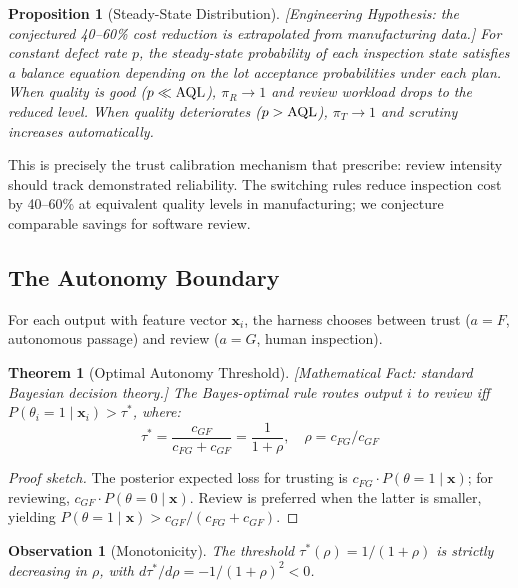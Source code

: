 \documentclass[11pt, a4paper]{googledeepmind}
\newtheorem{theorem}{Theorem}[section]
\newtheorem{proposition}{Proposition}[section]
\newtheorem{observation}{Observation}[section]
\begin{document}
\begin{proposition}[Steady-State Distribution]
\emph{[Engineering Hypothesis: the conjectured 40--60\% cost reduction is extrapolated from manufacturing data.]}
\label{prop:steady-state}
For constant defect rate $p$, the steady-state probability of each inspection state satisfies a balance equation depending on the lot acceptance probabilities under each plan. When quality is good ($p \ll \textup{AQL}$), $\pi_R \to 1$ and review workload drops to the reduced level. When quality deteriorates ($p > \textup{AQL}$), $\pi_T \to 1$ and scrutiny increases automatically.
\end{proposition}

This is precisely the trust calibration mechanism that \citet{lee2004trust} prescribe: review intensity should track demonstrated reliability. The switching rules reduce inspection cost by 40--60\% at equivalent quality levels in manufacturing; we conjecture comparable savings for software review.

\subsection{The Autonomy Boundary}

For each output with feature vector $\mathbf{x}_i$, the harness chooses between trust ($a = F$, autonomous passage) and review ($a = G$, human inspection).

\begin{theorem}[Optimal Autonomy Threshold]
\emph{[Mathematical Fact: standard Bayesian decision theory.]}
\label{thm:threshold}
The Bayes-optimal rule routes output $i$ to review iff $P(\theta_i = 1 \mid \mathbf{x}_i) > \tau^*$, where:
\begin{equation}
\tau^* = \frac{c_{GF}}{c_{FG} + c_{GF}} = \frac{1}{1 + \rho}, \quad \rho = c_{FG}/c_{GF}
\end{equation}
\end{theorem}

\begin{proof}[Proof sketch]
The posterior expected loss for trusting is $c_{FG} \cdot P(\theta = 1 \mid \mathbf{x})$; for reviewing, $c_{GF} \cdot P(\theta = 0 \mid \mathbf{x})$. Review is preferred when the latter is smaller, yielding $P(\theta = 1 \mid \mathbf{x}) > c_{GF}/(c_{FG} + c_{GF})$.
\end{proof}

\begin{observation}[Monotonicity]
\label{thm:monotonicity}
The threshold $\tau^*(\rho) = 1/(1+\rho)$ is strictly decreasing in $\rho$, with $d\tau^*/d\rho = -1/(1+\rho)^2 < 0$.
\end{observation}
\end{document}
